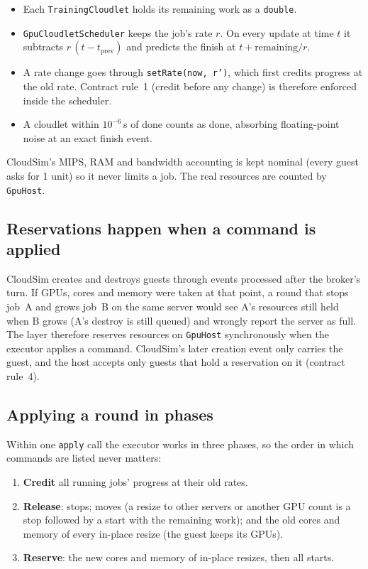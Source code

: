 \documentclass[11pt,a4paper]{article}
\newcommand{\code}[1]{\texttt{#1}}
\begin{document}
\begin{itemize}
  \item Each \code{TrainingCloudlet} holds its remaining work as a \code{double}.
  \item \code{GpuCloudletScheduler} keeps the job's rate $r$. On every update at time $t$ it subtracts
        $r\,(t - t_\text{prev})$ and predicts the finish at $t + \text{remaining}/r$.
  \item A rate change goes through \code{setRate(now, r')}, which first credits progress at the old
        rate. Contract rule~1 (credit before any change) is therefore enforced inside the scheduler.
  \item A cloudlet within $10^{-6}$\,s of done counts as done, absorbing floating-point noise at an
        exact finish event.
\end{itemize}

CloudSim's MIPS, RAM and bandwidth accounting is kept nominal (every guest asks for 1 unit) so it
never limits a job. The real resources are counted by \code{GpuHost}.

\subsection{Reservations happen when a command is applied}
CloudSim creates and destroys guests through events processed after the broker's turn. If GPUs,
cores and memory were taken at that point, a round that stops job~A and grows job~B on the same
server would see A's resources still held when B grows (A's destroy is still queued) and wrongly
report the server as full. The layer therefore reserves resources on \code{GpuHost} synchronously
when the executor applies a command. CloudSim's later creation event only carries the guest, and the
host accepts only guests that hold a reservation on it (contract rule~4).

\subsection{Applying a round in phases}
Within one \code{apply} call the executor works in three phases, so the order in which commands are
listed never matters:

\begin{enumerate}
  \item \textbf{Credit} all running jobs' progress at their old rates.
  \item \textbf{Release}: stops; moves (a resize to other servers or another GPU count is a stop
        followed by a start with the remaining work); and the old cores and memory of every
        in-place resize (the guest keeps its GPUs).
  \item \textbf{Reserve}: the new cores and memory of in-place resizes, then all starts.
\end{enumerate}
\end{document}
